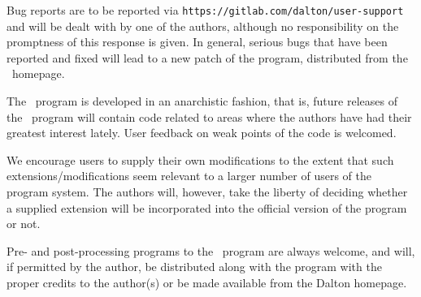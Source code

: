 Bug reports are to be reported via \verb|https://gitlab.com/dalton/user-support|
and will be dealt with by one of the authors, although no responsibility
on the promptness of this response is given. In general, serious bugs
that have been
reported and fixed will lead to a new patch of the program, distributed from the
\dalton\ homepage.

The \dalton\ program is developed in an anarchistic fashion, that is,
future releases of the \dalton\ program will contain code related to
areas where the authors have had their greatest interest
lately. User feedback on weak points of the code is welcomed.

We encourage users to supply their own
modifications to the extent that
such extensions/modifications seem relevant to a larger number of
users of the program system. The authors will, however, take the
liberty of deciding whether a supplied extension will be incorporated
into the official version of the program or not.

Pre- and post-processing programs to the \dalton\ program are always
welcome, and will, if permitted by the author, be distributed along
with the program with the proper credits to the
author(s) or be made available from the Dalton homepage.
